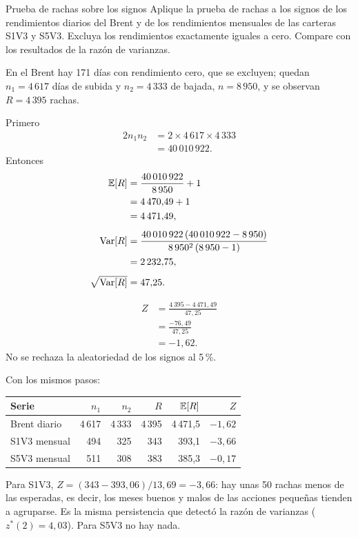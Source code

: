 \begin{ejresuelto}{Prueba de rachas sobre los signos}\label{ej:rachas}
\enunciado Aplique la prueba de rachas a los signos de los rendimientos diarios del Brent y de los rendimientos
mensuales de las carteras S1V3 y S5V3. Excluya los rendimientos exactamente iguales a cero. Compare con los
resultados de la razón de varianzas.

\solucion
{} En el Brent hay 171 días con rendimiento cero, que se excluyen; quedan $n_1=4\,617$ días
de subida y $n_2=4\,333$ de bajada, $n=8\,950$, y se observan $R=4\,395$ rachas.

 Primero
\begin{align*}
  2n_1n_2 &= 2\times4\,617\times4\,333\\
          &= 40\,010\,922 .
\end{align*}
Entonces
\begin{align*}
  \mathbb{E}[R] &= \frac{40\,010\,922}{8\,950}+1\\
        &= 4\,470{,}49+1\\
        &= 4\,471{,}49,\\[4pt]
  \operatorname{Var}[R] &= \frac{40\,010\,922\,(40\,010\,922-8\,950)}{8\,950^2\,(8\,950-1)}\\
          &= 2\,232{,}75,\\[4pt]
  \sqrt{\operatorname{Var}[R]} &= 47{,}25 .
\end{align*}

\begin{align*}
  Z &= \frac{4\,395-4\,471{,}49}{47{,}25}\\
    &= \frac{-76{,}49}{47{,}25}\\
    &= -1{,}62 .
\end{align*}
No se rechaza la aleatoriedad de los signos al 5\,\%.

 Con los mismos pasos:
\begin{center}\small
\begin{tabular}{@{}lrrrrr@{}}
\toprule
Serie & $n_1$ & $n_2$ & $R$ & $\mathbb{E}[R]$ & $Z$ \\
\midrule
Brent diario & 4\,617 & 4\,333 & 4\,395 & 4\,471,5 & $-1{,}62$ \\
S1V3 mensual & 494 & 325 & 343 & 393,1 & $-3{,}66$ \\
S5V3 mensual & 511 & 308 & 383 & 385,3 & $-0{,}17$ \\
\bottomrule
\end{tabular}
\end{center}
Para S1V3, $Z=(343-393{,}06)/13{,}69=-3{,}66$: hay unas 50 rachas menos de las esperadas, es decir, los meses
buenos y malos de las acciones pequeñas tienden a agruparse. Es la misma persistencia que detectó la razón de
varianzas ($z^*(2)=4{,}03$). Para S5V3 no hay nada.


\end{ejresuelto}
